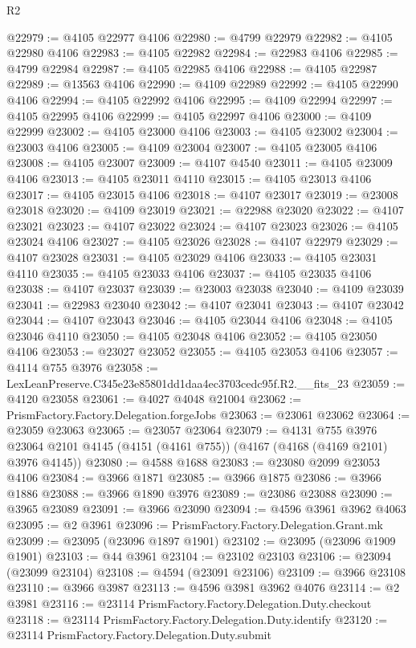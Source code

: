 \begin{lexlean}{R2}
\begin{coremodule}
@22979 := @4105 @22977 @4106
@22980 := @4799 @22979
@22982 := @4105 @22980 @4106
@22983 := @4105 @22982
@22984 := @22983 @4106
@22985 := @4799 @22984
@22987 := @4105 @22985 @4106
@22988 := @4105 @22987
@22989 := @13563 @4106
@22990 := @4109 @22989
@22992 := @4105 @22990 @4106
@22994 := @4105 @22992 @4106
@22995 := @4109 @22994
@22997 := @4105 @22995 @4106
@22999 := @4105 @22997 @4106
@23000 := @4109 @22999
@23002 := @4105 @23000 @4106
@23003 := @4105 @23002
@23004 := @23003 @4106
@23005 := @4109 @23004
@23007 := @4105 @23005 @4106
@23008 := @4105 @23007
@23009 := @4107 @4540
@23011 := @4105 @23009 @4106
@23013 := @4105 @23011 @4110
@23015 := @4105 @23013 @4106
@23017 := @4105 @23015 @4106
@23018 := @4107 @23017
@23019 := @23008 @23018
@23020 := @4109 @23019
@23021 := @22988 @23020
@23022 := @4107 @23021
@23023 := @4107 @23022
@23024 := @4107 @23023
@23026 := @4105 @23024 @4106
@23027 := @4105 @23026
@23028 := @4107 @22979
@23029 := @4107 @23028
@23031 := @4105 @23029 @4106
@23033 := @4105 @23031 @4110
@23035 := @4105 @23033 @4106
@23037 := @4105 @23035 @4106
@23038 := @4107 @23037
@23039 := @23003 @23038
@23040 := @4109 @23039
@23041 := @22983 @23040
@23042 := @4107 @23041
@23043 := @4107 @23042
@23044 := @4107 @23043
@23046 := @4105 @23044 @4106
@23048 := @4105 @23046 @4110
@23050 := @4105 @23048 @4106
@23052 := @4105 @23050 @4106
@23053 := @23027 @23052
@23055 := @4105 @23053 @4106
@23057 := @4114 @755 @3976
@23058 := LexLeanPreserve.C345e23e85801dd1daa4ec3703cedc95f.R2.__fits_23
@23059 := @4120 @23058
@23061 := @4027 @4048 @21004
@23062 := PrismFactory.Factory.Delegation.forgeJobs
@23063 := @23061 @23062
@23064 := @23059 @23063
@23065 := @23057 @23064
@23079 := @4131
    @755
    @3976
    @23064
    @2101
    @4145
    (@4151 (@4161 @755))
    (@4167 (@4168 (@4169 @2101) @3976 @4145))
@23080 := @4588 @1688
@23083 := @23080 @2099 @23053 @4106
@23084 := @3966 @1871
@23085 := @3966 @1875
@23086 := @3966 @1886
@23088 := @3966 @1890 @3976
@23089 := @23086 @23088
@23090 := @3965 @23089
@23091 := @3966 @23090
@23094 := @4596 @3961 @3962 @4063
@23095 := @2 @3961
@23096 := PrismFactory.Factory.Delegation.Grant.mk
@23099 := @23095 (@23096 @1897 @1901)
@23102 := @23095 (@23096 @1909 @1901)
@23103 := @44 @3961
@23104 := @23102 @23103
@23106 := @23094 (@23099 @23104)
@23108 := @4594 (@23091 @23106)
@23109 := @3966 @23108
@23110 := @3966 @3987
@23113 := @4596 @3981 @3962 @4076
@23114 := @2 @3981
@23116 := @23114 PrismFactory.Factory.Delegation.Duty.checkout
@23118 := @23114 PrismFactory.Factory.Delegation.Duty.identify
@23120 := @23114 PrismFactory.Factory.Delegation.Duty.submit

\end{coremodule}
\end{lexlean}
